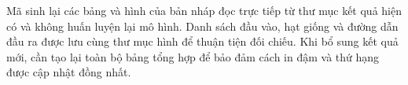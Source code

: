 Mã sinh lại các bảng và hình của bản nháp đọc trực tiếp từ thư mục kết quả hiện có và không huấn luyện lại mô hình. Danh sách đầu vào, hạt giống và đường dẫn đầu ra được lưu cùng thư mục hình để thuận tiện đối chiếu. Khi bổ sung kết quả mới, cần tạo lại toàn bộ bảng tổng hợp để bảo đảm cách in đậm và thứ hạng được cập nhật đồng nhất.
